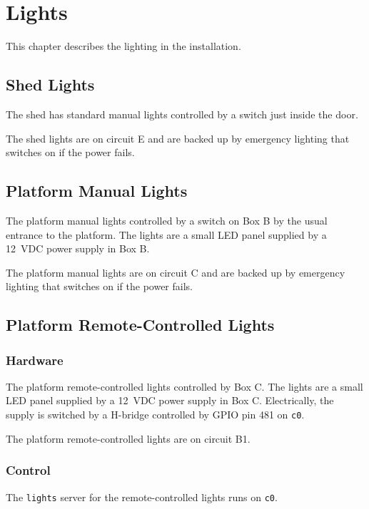 \chapter{Lights}
\label{chapter:lights}

This chapter describes the lighting in the {\projectname} installation. 

\section{Shed Lights}

The shed has standard manual lights controlled by a switch just inside the door. 

The shed lights are on circuit E and are backed up by emergency lighting that switches on if the power fails.

\section{Platform Manual Lights}

The platform manual lights controlled by a switch on Box B by the usual entrance to the platform. The lights are a small LED panel supplied by a 12~VDC power supply in Box B.

The platform manual lights are on circuit C and are backed up by emergency lighting that switches on if the power fails.
 
\section{Platform Remote-Controlled Lights}

\subsection{Hardware}

The platform remote-controlled lights controlled by Box C. The lights are a small LED panel supplied by a 12~VDC power supply in Box C. Electrically, the supply is switched by a H-bridge controlled by GPIO pin 481 on \verb|c0|.

The platform remote-controlled lights are on circuit B1.

\subsection{Control}

The \verb|lights| server for the remote-controlled lights runs on \verb|c0|.

